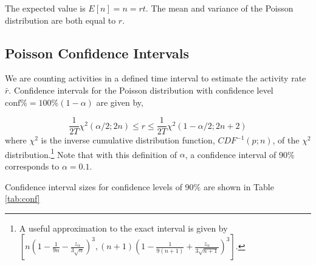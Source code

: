 \documentclass{article}
\begin{document}
The expected value is $E[n]=n=rt$. The mean and variance of the Poisson distribution are both equal to $r$.

\subsection{Poisson Confidence Intervals} 

We are counting activities in a defined time interval to estimate the activity rate $\bar{r}$. Confidence intervals \cite{Geo2012} for the
Poisson distribution with confidence level $\text{conf\%} = 100\%(1-\alpha)$ are given by,

\begin{equation}
    \label{eq:chisqconf}
    \frac{1}{2T} \chi^2(\alpha/2;2n) \leq r \leq \frac{1}{2T} \chi^2(1-\alpha/2;2n+2)
\end{equation}
where $\chi^2$ is the inverse cumulative distribution function, $CDF^{-1}(p; n)$, of the $\chi^2$ distribution.\footnote{A useful approximation to the exact interval is given by  $[ n(1 - \frac{1}{9n} - \frac{z_{\alpha}}{3\sqrt{n}})^3 , (n+1)(1- \frac{1}{9(n+1)} + \frac{z_{\alpha}}{3\sqrt{n+1}})^3]$. }
Note that with this definition of $\alpha$, a confidence interval of 90\% corresponds to $\alpha=0.1$.

Confidence interval sizes for confidence levels of 90\% are shown in Table \ref{tab:conf}
\end{document}
